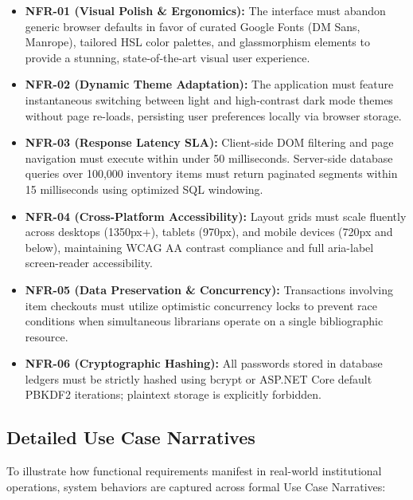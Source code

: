 \documentclass[10pt,journal,compsoc]{IEEEtran}
\begin{document}
\begin{itemize}[leftmargin=1.5em]
    \item \textbf{NFR-01 (Visual Polish \& Ergonomics):} The interface must abandon generic browser defaults in favor of curated Google Fonts (DM Sans, Manrope), tailored HSL color palettes, and glassmorphism elements to provide a stunning, state-of-the-art visual user experience.
    \item \textbf{NFR-02 (Dynamic Theme Adaptation):} The application must feature instantaneous switching between light and high-contrast dark mode themes without page re-loads, persisting user preferences locally via browser storage.
    \item \textbf{NFR-03 (Response Latency SLA):} Client-side DOM filtering and page navigation must execute within under 50 milliseconds. Server-side database queries over 100,000 inventory items must return paginated segments within 15 milliseconds using optimized SQL windowing.
    \item \textbf{NFR-04 (Cross-Platform Accessibility):} Layout grids must scale fluently across desktops (1350px+), tablets (970px), and mobile devices (720px and below), maintaining WCAG AA contrast compliance and full aria-label screen-reader accessibility.
    \item \textbf{NFR-05 (Data Preservation \& Concurrency):} Transactions involving item checkouts must utilize optimistic concurrency locks to prevent race conditions when simultaneous librarians operate on a single bibliographic resource.
    \item \textbf{NFR-06 (Cryptographic Hashing):} All passwords stored in database ledgers must be strictly hashed using bcrypt or ASP.NET Core default PBKDF2 iterations; plaintext storage is explicitly forbidden.
\end{itemize}

\newpage

\subsection{Detailed Use Case Narratives}
To illustrate how functional requirements manifest in real-world institutional operations, system behaviors are captured across formal Use Case Narratives:
\end{document}
